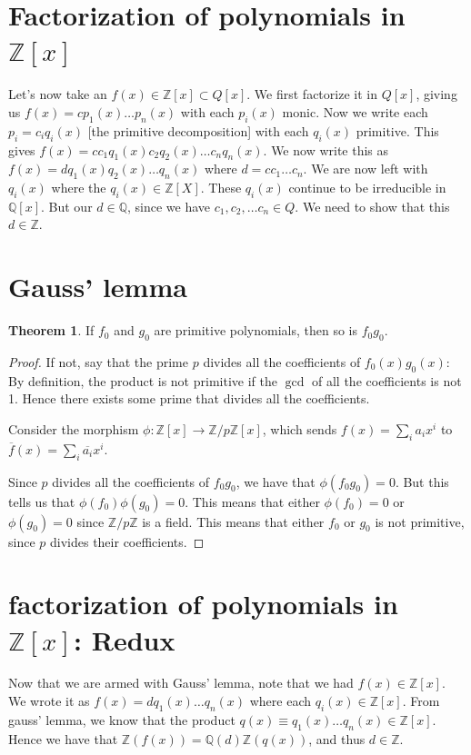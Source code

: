 \documentclass{book}
\newcommand{\Z}{\ensuremath{\mathbb{Z}}}
\newcommand{\Q}{\ensuremath{\mathbb{Q}}}
\theoremstyle{definition}
\newtheorem{theorem}{Theorem}
\begin{document}
\section{Factorization of polynomials in $\Z[x]$}

Let's now take an $f(x) \in \Z[x] \subset Q[x]$. We first factorize it in $Q[x]$,
giving us $f(x) = c p_1(x) \dots p_n(x)$ with each $p_i(x)$ monic.
Now we write each $p_i = c_i q_i(x)$
[the primitive decomposition] with each $q_i(x)$ primitive.
This gives $f(x) = c c_1 q_1(x) c_2 q_2(x) \dots c_n q_n(x)$.
We now write this as $f(x) = d q_1(x) q_2(x) \dots q_n(x)$ where $d = c c_1 \dots c_n$.
We are now left with $q_i(x)$ where the $q_i(x) \in \Z[X]$. These $q_i(x)$
continue to be irreducible in $\Q[x]$. But our $d \in \Q$, since we have
$c_1, c_2, \dots c_n \in Q$. We need to show that this $d \in \Z$.

\section{Gauss' lemma}

\begin{theorem}
    If $f_0$ and $g_0$ are primitive polynomials, then so is $f_0 g_0$.
\end{theorem}
\begin{proof}
    If not, say that the prime $p$ divides all the coefficients of $f_0(x) g_0(x)$:
    By definition, the product is not primitive if the $\gcd$ of all the coefficients
    is not 1. Hence there exists some prime that divides all the coefficients.


    Consider the morphism $\phi: \Z[x] \rightarrow \Z/p\Z[x]$, which sends $f(x) = \sum_i a_i x^i$
    to $\overline{f}(x) = \sum_i \overline{a_i}x^i$.

    Since $p$ divides all the coefficients of $f_0 g_0$, we have that $\phi(f_0 g_0) = 0$.
    But this tells us that $\phi(f_0) \phi(g_0) = 0$. This means that either $\phi(f_0) = 0$
    or $\phi(g_0) = 0$ since $\Z/p\Z$ is a field. This means that either $f_0$
    or $g_0$ is not primitive, since $p$ divides their coefficients.
\end{proof}


\section{factorization of polynomials in $\Z[x]$: Redux}
Now that we are armed with Gauss' lemma, note that we had $f(x) \in \Z[x]$.
We wrote it as $f(x) = d q_1(x) \dots q_n(x)$ where each $q_i(x) \in \Z[x]$.
From gauss' lemma, we know that the product
$q(x) \equiv q_1(x) \dots q_n(x) \in \Z[x]$.
Hence we have that $\Z (f(x)) = \Q(d) \Z (q(x))$, and thus $d \in \Z$.
\end{document}
